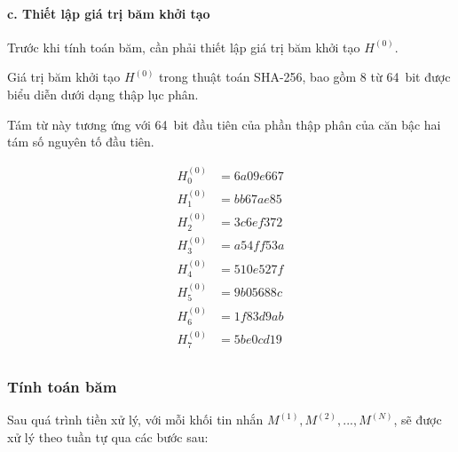 \paragraph{c. Thiết lập giá trị băm khởi tạo}\quad

Trước khi tính toán băm, cần phải thiết lập giá trị băm khởi tạo $H^{(0)}$.

Giá trị băm khởi tạo $H^{(0)}$ trong thuật toán SHA-256, bao gồm 8 từ 64~bit 	được biểu diễn dưới dạng thập lục phân.

Tám từ này tương ứng với 64~bit đầu tiên của phần thập phân của căn bậc hai tám số nguyên tố đầu tiên. 

\begin{align*}
	H_0^{(0)} &= 6a09e667 \\
	H_1^{(0)} &= bb67ae85 \\
	H_2^{(0)} &= 3c6ef372 \\
	H_3^{(0)} &= a54ff53a \\
	H_4^{(0)} &= 510e527f \\
	H_5^{(0)} &= 9b05688c \\
	H_6^{(0)} &= 1f83d9ab \\
	H_7^{(0)} &= 5be0cd19 \\	
\end{align*}
\subsubsection{Tính toán băm}

Sau quá trình tiền xử lý, với mỗi khối tin nhắn $M^{(1)}, M^{(2)},...,M^{(N)}$, sẽ được xử lý theo tuần tự qua các bước sau:

